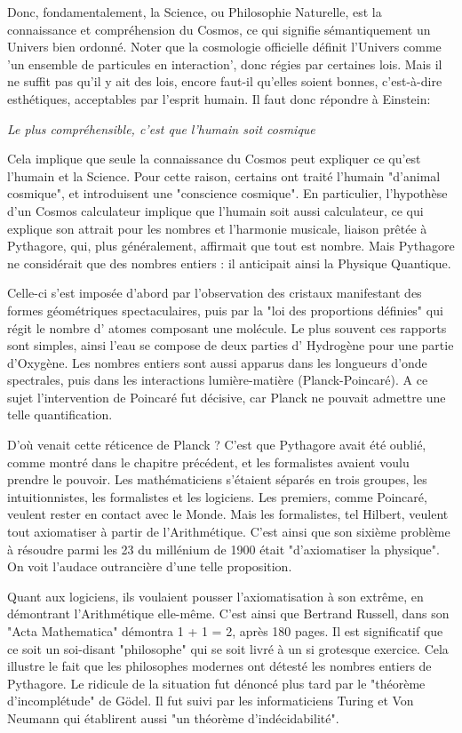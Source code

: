 \documentclass[a4paper,12pt]{article}
\begin{document}
Donc, fondamentalement, la Science, ou Philosophie Naturelle, est la connaissance et compréhension du Cosmos, ce qui signifie sémantiquement un Univers bien ordonné. Noter que la cosmologie officielle définit l'Univers comme 'un ensemble de particules en interaction', donc régies par certaines lois. Mais il ne suffit pas qu'il y ait des lois, encore faut-il qu'elles soient bonnes, c'est-à-dire esthétiques,  acceptables par l'esprit humain. Il faut donc répondre à Einstein:

\textit {Le plus compréhensible, c'est que l'humain soit cosmique}

Cela implique que seule la connaissance du Cosmos peut expliquer ce qu'est l'humain et la Science. Pour cette raison, certains ont traité l'humain "d'animal cosmique", et introduisent une "conscience cosmique". En particulier, l'hypothèse d'un Cosmos calculateur implique que l'humain soit aussi calculateur, ce qui explique son attrait pour les nombres et l'harmonie musicale, liaison prêtée à Pythagore, qui, plus généralement, affirmait que tout est nombre. Mais Pythagore ne considérait que des nombres entiers : il anticipait ainsi la Physique Quantique.  

Celle-ci s'est imposée d'abord par l'observation des cristaux manifestant des formes géométriques spectaculaires, puis par la "loi des proportions définies" qui régit le nombre d' atomes composant une molécule. Le plus souvent ces rapports sont simples, ainsi l'eau se compose de deux parties d' Hydrogène pour une partie d'Oxygène. Les nombres entiers sont aussi apparus dans les longueurs d'onde spectrales, puis dans les interactions lumière-matière (Planck-Poincaré). A ce sujet l'intervention de Poincaré fut décisive, car Planck ne pouvait admettre une telle quantification.

D'où venait cette réticence de Planck ? C'est que Pythagore avait été oublié, comme montré dans le chapitre précédent, et les formalistes avaient voulu prendre le pouvoir. Les mathématiciens s'étaient séparés en trois groupes, les intuitionnistes, les formalistes et les logiciens. Les premiers, comme Poincaré, veulent rester en contact avec le Monde. Mais les formalistes, tel Hilbert, veulent tout axiomatiser à partir de l'Arithmétique. C'est ainsi que son sixième problème à résoudre parmi les 23 du millénium de 1900 était "d'axiomatiser la physique". On voit l'audace outrancière d'une telle proposition. 

Quant aux logiciens, ils voulaient pousser l'axiomatisation à son extrême, en démontrant l'Arithmétique elle-même. C'est ainsi que Bertrand Russell, dans son "Acta Mathematica" démontra 1 + 1 = 2, après 180 pages. Il est significatif que ce soit un soi-disant "philosophe" qui se soit livré à un si grotesque exercice. Cela illustre le fait que les philosophes modernes ont détesté les nombres entiers de Pythagore. Le ridicule de la situation fut dénoncé plus tard par le "théorème d'incomplétude" de Gödel. Il fut suivi par les informaticiens Turing et Von Neumann qui établirent aussi "un théorème d'indécidabilité". 
\end{document}
